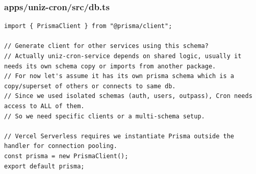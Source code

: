 \documentclass[11pt,a4paper,oneside]{article}
\begin{document}
\subsubsection*{apps/uniz-cron/src/db.ts}
\begin{lstlisting}
import { PrismaClient } from "@prisma/client";

// Generate client for other services using this schema?
// Actually uniz-cron-service depends on shared logic, usually it needs its own schema copy or imports from another package.
// For now let's assume it has its own prisma schema which is a copy/superset of others or connects to same db.
// Since we used isolated schemas (auth, users, outpass), Cron needs access to ALL of them.
// So we need specific clients or a multi-schema setup.

// Vercel Serverless requires we instantiate Prisma outside the handler for connection pooling.
const prisma = new PrismaClient();
export default prisma;

\end{lstlisting}
\end{document}
